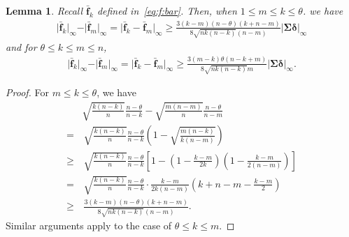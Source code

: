 \documentclass[10pt,a4paper]{amsart}
\newtheorem{lem}{Lemma}
\newcommand{\cp}{\theta}
\renewcommand{\l}{\left}
\newcommand{\mbf}{\mathbf}
\renewcommand{\r}{\right}
\begin{document}
\begin{lem}
\label{lem:f:bar}
Recall $\bar{\mbf f}_k$ defined in~\eqref{eq:f:bar}.
Then, when $1 \le m \le k \le \cp$. we have
\begin{align*}
\vert \bar{\mbf f}_k \vert_\infty - \vert \bar{\mbf f}_m \vert_\infty  = \vert \bar{\mbf f}_k - \bar{\mbf f}_m \vert_\infty \ge \frac{3(k - m)(n - \cp)(k + n - m)}{8\sqrt{n k (n - k)} (n - m)} \vert \bm\Sigma \bm\delta \vert_\infty
\end{align*}
and for $\cp \le k \le m \le n$,
\begin{align*}
\vert \bar{\mbf f}_k \vert_\infty - \vert \bar{\mbf f}_m \vert_\infty = \vert \bar{\mbf f}_k - \bar{\mbf f}_m \vert_\infty \ge \frac{3(m - k) \cp (n - k + m)}{8\sqrt{n k (n - k)} m} \vert \bm\Sigma \bm\delta \vert_\infty.
\end{align*}
\end{lem}

\begin{proof}
For $m \le k \le \cp$, we have
\begin{align*}
& \sqrt{\frac{k (n - k)}{n}} \frac{n - \cp}{n - k} - \sqrt{\frac{m (n - m)}{n}} \frac{n - \cp}{n - m} 
\\
=& \, \sqrt{\frac{k (n - k)}{n}} \frac{n - \cp}{n - k} \l( 1 - \sqrt{\frac{m (n - k)}{k (n - m)}} \r)
\\
\ge& \, \sqrt{\frac{k (n - k)}{n}} \frac{n - \cp}{n - k} \l[ 1 - \l(1 - \frac{k - m}{2k} \r) \l(1 - \frac{k - m}{2(n - m)} \r) \r] 
\\
=& \, \sqrt{\frac{k (n - k)}{n}} \frac{n - \cp}{n - k} \cdot \frac{k - m}{2k (n - m)} \l( k + n - m - \frac{k - m}{2} \r)
\\
\ge& \, \frac{3(k - m)(n - \cp)(k + n - m)}{8\sqrt{n k (n - k)} (n - m)}.
\end{align*}
Similar arguments apply to the case of $\cp \le k \le m$.
\end{proof}
\end{document}
